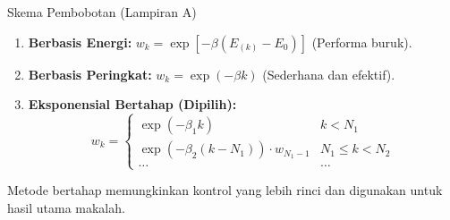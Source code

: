 \begin{frame}{Skema Pembobotan (Lampiran A)}
    \begin{enumerate}
        \item \textbf{Berbasis Energi:} $w_k = \exp [ -\beta(E_{(k)} - E_0) ]$ (Performa buruk).
        \item \textbf{Berbasis Peringkat:} $w_k = \exp(-\beta k)$ (Sederhana dan efektif).
        \item \textbf{Eksponensial Bertahap (Dipilih):}
        $$ w_k = \begin{cases} 
            \exp(-\beta_1 k) & k < N_1 \\
            \exp(-\beta_2 (k - N_1)) \cdot w_{N_1 - 1} & N_1 \le k < N_2 \\
            \dots & \dots
        \end{cases} $$
    \end{enumerate}
    Metode bertahap memungkinkan kontrol yang lebih rinci dan digunakan untuk hasil utama makalah.
\end{frame}
